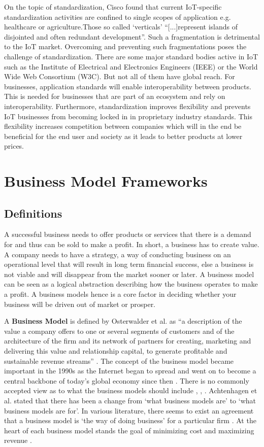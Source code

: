 		On the topic of standardization, Cisco found that current IoT-specific standardization activities are confined to single scopes of application e.g. healthcare or agriculture.Those so called `verticals' ``[...]represent islands of disjointed and often redundant development''\cite[p.18]{cisco}. Such a fragmentation is detrimental to the IoT market. Overcoming and preventing such fragmentations poses the challenge of standardization. There are some major standard bodies active in IoT such as the Institute of Electrical and Electronics Engineers (IEEE) or the World Wide Web Consortium (W3C). But not all of them have global reach. For businesses, application standards will enable interoperability between products. This is needed for businesses that are part of an ecosystem and rely on interoperability. Furthermore, standardization improves flexibility and prevents IoT businesses from becoming locked in in proprietary industry standards. This flexibility increases competition between companies which will in the end be beneficial for the end user and society as it leads to better products at lower prices.
	

\section{Business Model Frameworks}
\label{sec:bmf}	
	\subsection{Definitions} 
		A successful business needs to offer products or services that there is a demand for and thus can be sold to make a profit. In short, a business has to create value. A company needs to have a strategy, a way of conducting business on an operational level that will result in long term financial success, else a business is not viable and will disappear from the market sooner or later.
		A business model can be seen as a logical abstraction describing how the business operates to make a profit. A business models hence is a core factor in deciding whether your business will be driven out of market or prosper.

		A \textbf{Business Model} is defined by Osterwalder et al. as ``a description of the value a company offers to one or several segments of customers and of the architecture of the firm and its network of partners for creating, marketing and delivering this value and relationship capital, to generate profitable and sustainable revenue streams'' \cite{osterwalder2005}. The concept of the business model became important in the 1990s as the Internet began to spread and went on to become a central backbone of today's global economy since then \cite{zott}. There is no commonly accepted view as to what the business models should include \cite{morris}, \cite{osterwalder2005}, \cite{schweizer}. Achtenhagen et al. \cite{achtenhagen} stated that there has been a change from `what business models are' to `what business models are for'. In various literature, there seems to exist an agreement that a business model is `the way of doing business' for a particular firm \cite{westerlund}. At the heart of each business model stands the goal of minimizing cost and maximizing revenue \cite{ju}.
 		

